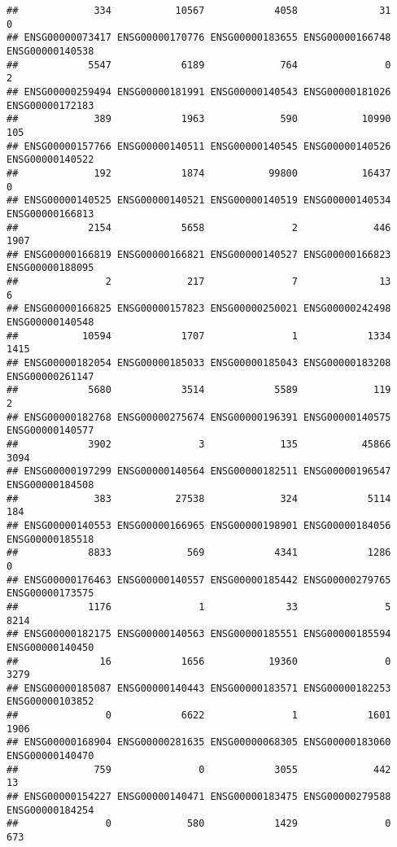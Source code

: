 \documentclass[
]{article}
\begin{document}
\begin{verbatim}
##             334           10567            4058              31               0 
## ENSG00000073417 ENSG00000170776 ENSG00000183655 ENSG00000166748 ENSG00000140538 
##            5547            6189             764               0               2 
## ENSG00000259494 ENSG00000181991 ENSG00000140543 ENSG00000181026 ENSG00000172183 
##             389            1963             590           10990             105 
## ENSG00000157766 ENSG00000140511 ENSG00000140545 ENSG00000140526 ENSG00000140522 
##             192            1874           99800           16437               0 
## ENSG00000140525 ENSG00000140521 ENSG00000140519 ENSG00000140534 ENSG00000166813 
##            2154            5658               2             446            1907 
## ENSG00000166819 ENSG00000166821 ENSG00000140527 ENSG00000166823 ENSG00000188095 
##               2             217               7              13               6 
## ENSG00000166825 ENSG00000157823 ENSG00000250021 ENSG00000242498 ENSG00000140548 
##           10594            1707               1            1334            1415 
## ENSG00000182054 ENSG00000185033 ENSG00000185043 ENSG00000183208 ENSG00000261147 
##            5680            3514            5589             119               2 
## ENSG00000182768 ENSG00000275674 ENSG00000196391 ENSG00000140575 ENSG00000140577 
##            3902               3             135           45866            3094 
## ENSG00000197299 ENSG00000140564 ENSG00000182511 ENSG00000196547 ENSG00000184508 
##             383           27538             324            5114             184 
## ENSG00000140553 ENSG00000166965 ENSG00000198901 ENSG00000184056 ENSG00000185518 
##            8833             569            4341            1286               0 
## ENSG00000176463 ENSG00000140557 ENSG00000185442 ENSG00000279765 ENSG00000173575 
##            1176               1              33               5            8214 
## ENSG00000182175 ENSG00000140563 ENSG00000185551 ENSG00000185594 ENSG00000140450 
##              16            1656           19360               0            3279 
## ENSG00000185087 ENSG00000140443 ENSG00000183571 ENSG00000182253 ENSG00000103852 
##               0            6622               1            1601            1906 
## ENSG00000168904 ENSG00000281635 ENSG00000068305 ENSG00000183060 ENSG00000140470 
##             759               0            3055             442              13 
## ENSG00000154227 ENSG00000140471 ENSG00000183475 ENSG00000279588 ENSG00000184254 
##               0             580            1429               0             673 

\end{verbatim}
\end{document}

